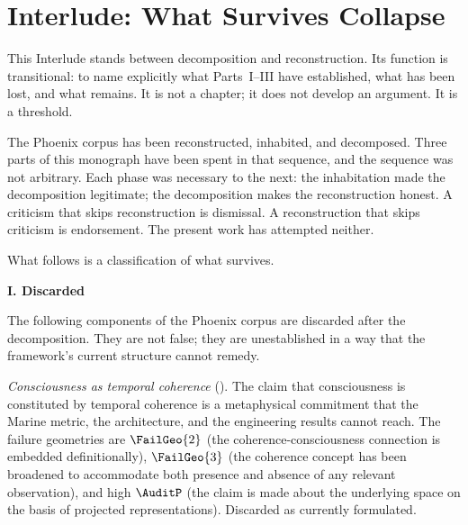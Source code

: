 
\chapter*{Interlude: What Survives Collapse}
\label{interlude:collapse}

\vspace{8pt}
\begin{interlude}
  This Interlude stands between decomposition and reconstruction.
  Its function is transitional: to name explicitly what Parts~I--III
  have established, what has been lost, and what remains. It is
  not a chapter; it does not develop an argument. It is a threshold.
\end{interlude}
\vspace{12pt}

\noindent
The Phoenix corpus has been reconstructed, inhabited, and
decomposed. Three parts of this monograph have been spent
in that sequence, and the sequence was not arbitrary. Each
phase was necessary to the next: the inhabitation made the
decomposition legitimate; the decomposition makes the
reconstruction honest. A criticism that skips reconstruction
is dismissal. A reconstruction that skips criticism is
endorsement. The present work has attempted neither.

What follows is a classification of what survives.

\bigskip
\noindent\textbf{I. Discarded}

\medskip

The following components of the Phoenix corpus are
discarded after the decomposition. They are not false;
they are unestablished in a way that the framework's
current structure cannot remedy.

\textit{Consciousness as temporal coherence} (\LevelIV{}).
The claim that consciousness is constituted by temporal
coherence is a metaphysical commitment that the Marine
metric, the \MEMeight{} architecture, and the engineering
results cannot reach. The failure geometries are $\FailGeo{2}$
(the coherence-consciousness connection is embedded
definitionally), $\FailGeo{3}$ (the coherence concept
has been broadened to accommodate both presence and
absence of any relevant observation), and high $\AuditP$
(the claim is made about the underlying space on the
basis of projected representations). Discarded as
currently formulated.

